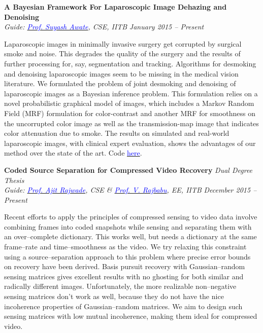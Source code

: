 \documentclass[margin,line]{res}
\newenvironment{list1}{
  \begin{list}{\ding{113}}{%
      \setlength{\itemsep}{0in}
      \setlength{\parsep}{0in} \setlength{\parskip}{0in}
      \setlength{\topsep}{0in} \setlength{\partopsep}{0in} 
      \setlength{\leftmargin}{0.17in}}}{\end{list}}
\begin{document}
\begin{resume}
{\bf A Bayesian Framework For Laparoscopic Image Dehazing and Denoising} \\
{\em Guide: \href{https://www.cse.iitb.ac.in/~suyash}{\textcolor{blue}{Prof. Suyash Awate}}, CSE, IITB} \hfill {\it January 2015 -- Present} \\
\vspace*{-.13in}
\begin{list1}
\item[]
Laparoscopic images in minimally invasive surgery get corrupted by surgical smoke and noise. This degrades the quality of the surgery and the results of further processing for, say, segmentation and tracking. Algorithms for desmoking and denoising laparoscopic images seem to be missing in the medical vision literature. We formulated the problem of joint desmoking and denoising of laparoscopic images as a Bayesian inference problem. This formulation relies on a novel probabilistic graphical model of images, which includes a Markov Random Field (MRF) formulation for color-contrast and another MRF for smoothness on the uncorrupted color image as well as the transmission-map image that indicates color attenuation due to smoke. The results on simulated and real-world laparoscopic images, with clinical expert evaluation, shows the advantages of our method over the state of the art. Code \href{https://github.com/alankarkotwal/lap-dehazing}{\textcolor{blue} {here}}.
\end{list1}

{\bf Coded Source Separation for Compressed Video Recovery} \hfill \textit{Dual Degree Thesis} \\
{\em Guide: \href{https://www.cse.iitb.ac.in/~ajitvr}{\textcolor{blue}{Prof. Ajit Rajwade}}, CSE \& \href{https://www.ee.iitb.ac.in/wiki/faculty/rajbabu}{\textcolor{blue}{Prof. V. Rajbabu}}, EE, IITB} \hfill {\it December 2015 -- Present} \\
\vspace*{-.13in}
\begin{list1}
\item[]
Recent efforts to apply the principles of compressed sensing to video data involve combining frames into coded snapshots while sensing and separating them with an over--complete dictionary. This works well, but needs a dictionary at the same frame--rate and time--smoothness as the video. We try relaxing this constraint using a source--separation approach to this problem where precise error bounds on recovery have been derived. Basis pursuit recovery with Gaussian--random sensing matrices gives excellent results with no ghosting for both similar and radically different images. Unfortunately, the more realizable non--negative sensing matrices don't work as well, because they do not have the nice incoherence properties of Gaussian--random matrices. We aim to design such sensing matrices with low mutual incoherence, making them ideal for compressed video.
\end{list1}


\end{resume}
\end{document}
